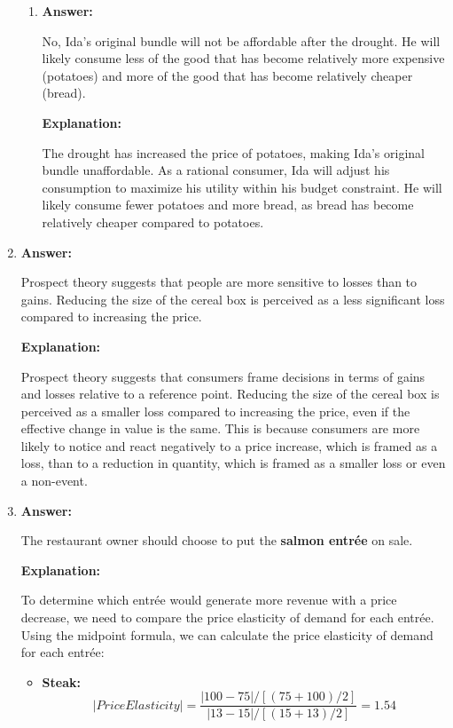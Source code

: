 \documentclass{article}
\begin{document}
\begin{enumerate}
\begin{enumerate}
              \item \textbf{Answer:}

                    No, Ida's original bundle will not be affordable after the drought. He will likely consume less of the good that has become relatively more expensive (potatoes) and more of the good that has become relatively cheaper (bread).

                    \textbf{Explanation:}

                    The drought has increased the price of potatoes, making Ida's original bundle unaffordable. As a rational consumer, Ida will adjust his consumption to maximize his utility within his budget constraint. He will likely consume fewer potatoes and more bread, as bread has become relatively cheaper compared to potatoes.
          \end{enumerate}

    \item \textbf{Answer:}

          Prospect theory suggests that people are more sensitive to losses than to gains. Reducing the size of the cereal box is perceived as a less significant loss compared to increasing the price.

          \textbf{Explanation:}

          Prospect theory suggests that consumers frame decisions in terms of gains and losses relative to a reference point. Reducing the size of the cereal box is perceived as a smaller loss compared to increasing the price, even if the effective change in value is the same. This is because consumers are more likely to notice and react negatively to a price increase, which is framed as a loss, than to a reduction in quantity, which is framed as a smaller loss or even a non-event.

    \item \textbf{Answer:}

          The restaurant owner should choose to put the \textbf{salmon entr\'ee} on sale.

          \textbf{Explanation:}

          To determine which entr\'ee would generate more revenue with a price decrease, we need to compare the price elasticity of demand for each entr\'ee. Using the midpoint formula, we can calculate the price elasticity of demand for each entr\'ee:

          \begin{itemize}
              \item \textbf{Steak:}
                    \begin{equation*}
                        |Price Elasticity| = \frac{|100 - 75| / [(75 + 100) / 2]}{|13 - 15| / [(15 + 13) / 2]} = 1.54
                    \end{equation*}


\end{itemize}
\end{enumerate}
\end{document}
